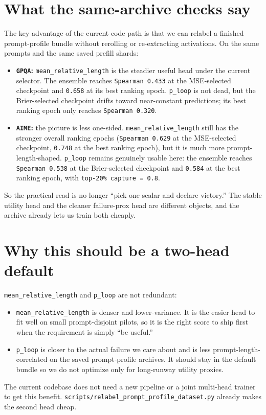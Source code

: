 \documentclass[11pt]{article}
\begin{document}
\section*{What the same-archive checks say}
The key advantage of the current code path is that we can relabel a finished
prompt-profile bundle without rerolling or re-extracting activations. On the
same prompts and the same saved prefill shards:
\begin{itemize}[leftmargin=1.5em]
\item \textbf{\texttt{GPQA}:} \texttt{mean\_relative\_length} is the steadier useful
head under the current selector. The ensemble reaches \texttt{Spearman 0.433} at the
MSE-selected checkpoint and \texttt{0.658} at its best ranking epoch. \texttt{p\_loop}
is not dead, but the Brier-selected checkpoint drifts toward near-constant
predictions; its best ranking epoch only reaches \texttt{Spearman 0.320}.
\item \textbf{\texttt{AIME}:} the picture is less one-sided. \texttt{mean\_relative\_length}
still has the stronger overall ranking epochs (\texttt{Spearman 0.629} at the
MSE-selected checkpoint, \texttt{0.748} at the best ranking epoch), but it is much
more prompt-length-shaped. \texttt{p\_loop} remains genuinely usable here:
the ensemble reaches \texttt{Spearman 0.538} at the Brier-selected checkpoint and
\texttt{0.584} at the best ranking epoch, with \texttt{top-20\% capture = 0.8}.
\end{itemize}
So the practical read is no longer ``pick one scalar and declare victory.'' The
stable utility head and the cleaner failure-prox head are different objects, and
the archive already lets us train both cheaply.

\section*{Why this should be a two-head default}
\texttt{mean\_relative\_length} and \texttt{p\_loop} are not redundant:
\begin{itemize}[leftmargin=1.5em]
\item \texttt{mean\_relative\_length} is denser and lower-variance. It is the easier
head to fit well on small prompt-disjoint pilots, so it is the right score to
ship first when the requirement is simply ``be useful.''
\item \texttt{p\_loop} is closer to the actual failure we care about and is less
prompt-length-correlated on the saved prompt-profile archives. It should stay in
the default bundle so we do not optimize only for long-runway utility proxies.
\end{itemize}
The current codebase does not need a new pipeline or a joint multi-head trainer
to get this benefit. \texttt{scripts/relabel\_prompt\_profile\_dataset.py} already
makes the second head cheap.
\end{document}
